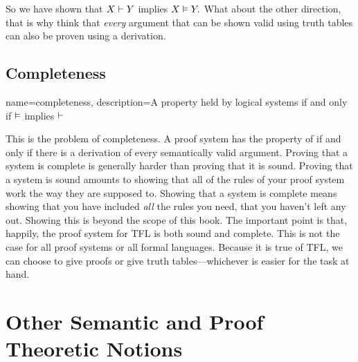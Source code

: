So we have shown that $X \vdash  Y$ implies $X \vDash Y.$ What about the other direction, that is why think that \emph{every} argument that can be shown valid using truth tables can also be proven using a derivation. 

\subsection{Completeness}
{
name=completeness,
description={A property held by logical systems if and only if $\vDash $ implies $\vdash $}
}

This is the problem of completeness. A proof system has the property of   \label{def:completeness} if and only if there is a derivation of every semantically valid argument. Proving that a system is complete is generally harder than proving that it is sound. Proving that a system is sound amounts to showing that all of the rules of your proof system work the way they are supposed to. Showing that a system is complete means showing that you have included \emph{all} the rules you need, that you haven't left any out. Showing this is beyond the scope of this book. The important point is that, happily, the proof system for TFL is both sound and complete. This is not the case for all proof systems or all formal languages. Because it is true of TFL, we can choose to give proofs or give truth tables---whichever is easier for the task at hand.


\section{Other Semantic and Proof Theoretic Notions}

%


